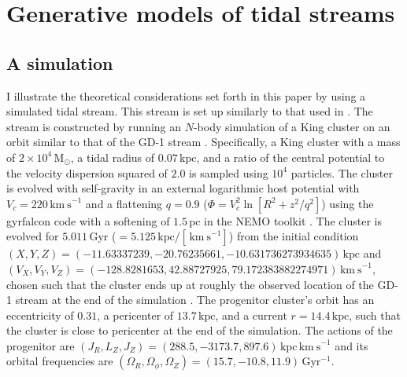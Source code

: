 \documentclass[12pt,preprint]{aastex}
\newcommand{\Gyr}{\ensuremath{\,\mathrm{Gyr}}}
\newcommand{\kpc}{\ensuremath{\,\mathrm{kpc}}}
\newcommand{\pc}{\ensuremath{\,\mathrm{pc}}}
\newcommand{\kms}{\ensuremath{\,\mathrm{km\ s}^{-1}}}
\newcommand{\msun}{\ensuremath{\,\mathrm{M}_{\odot}}}
\newcommand{\inv}{\ensuremath{^{-1}}}
\begin{document}
\section{Generative models of tidal streams}\label{sec:generative}

\subsection{A simulation}\label{sec:sim}

I illustrate the theoretical considerations set forth in this paper by
using a simulated tidal stream. This stream is set up similarly to
that used in \citet{Sanders13b}. The stream is constructed by running
an $N$-body simulation of a King cluster \citep{King66a} on an orbit
similar to that of the GD-1 stream \citep{Koposov10a}. Specifically, a
King cluster with a mass of $2\times10^4\msun$, a tidal radius of
$0.07\kpc$, and a ratio of the central potential to the velocity
dispersion squared of $2.0$ is sampled using $10^4$ particles. The
cluster is evolved with self-gravity in an external logarithmic host
potential with $V_c = 220\kms$ and a flattening $q=0.9$ ($\Phi = V_c^2
\ln [R^2 + z^2/q^2]$) using the gyrfalcon code
\citep{Dehnen00a,Dehnen02a} with a softening of $1.5\pc$ in the NEMO
toolkit \citep{Teuben95a}. The cluster is evolved for $5.011\Gyr$
($=5.125\kpc/[\kms]$) from the initial condition $(X,Y,Z) =
(-11.63337239,-20.76235661,-10.631736273934635)\kpc$ and
$(V_X,V_Y,V_Z) = (-128.8281653,42.88727925,79.172383882274971)\kms$,
chosen such that the cluster ends up at roughly the observed location
of the GD-1 stream at the end of the simulation
\citep{Koposov10a}. The progenitor cluster's orbit has an eccentricity
of $0.31$, a pericenter of $13.7\kpc$, and a current $r=14.4\kpc$,
such that the cluster is close to pericenter at the end of the
simulation. The actions of the progenitor are $(J_R,L_Z,J_Z) =
(288.5,-3173.7,897.6)\kpc\kms$ and its orbital frequencies are
$(\Omega_R,\Omega_\phi,\Omega_Z) = (15.7,-10.8,11.9)\Gyr\inv$.
\end{document}
